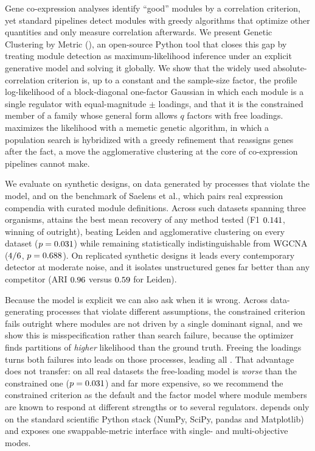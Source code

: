 Gene co-expression analyses identify ``good'' modules by a correlation criterion,
yet standard pipelines detect modules with greedy algorithms that optimize other
quantities and only measure correlation afterwards. We present Genetic Clustering
by Metric (\tool{}), an open-source Python tool that closes this gap by treating
module detection as maximum-likelihood inference under an explicit generative
model and solving it globally. We show that the widely used absolute-correlation
criterion is, up to a constant and the sample-size factor, the profile
log-likelihood of a block-diagonal one-factor Gaussian in which each module is a
single regulator with equal-magnitude $\pm$ loadings, and that it is the
constrained member of a family whose general form allows $q$ factors with free
loadings. \tool{} maximizes the likelihood with a memetic genetic
algorithm, in which a population search is hybridized with a greedy refinement that
reassigns genes after the fact, a move the agglomerative clustering at the core
of co-expression pipelines cannot make.

We evaluate on synthetic designs, on data generated by processes that violate the
model, and on the benchmark of Saelens et al., which pairs
real expression compendia with curated module definitions. Across
\SaelensNDatasets{} such datasets spanning three organisms, \tool{} attains the
best mean recovery of any method tested (F1 $0.141{}$, winning
\SaelensLoglikWins{} of \SaelensNDatasets{} outright), beating
Leiden and agglomerative clustering on every dataset ($p=0.031{}$) while
remaining statistically indistinguishable from WGCNA ($4/6{}$,
$p=0.688{}$). On replicated synthetic designs it leads every contemporary
detector at moderate noise, and it isolates unstructured genes far better than any
competitor (ARI $0.96{}$ versus $0.59{}$ for
Leiden).

Because the model is explicit we can also ask when it is wrong. Across
\MisspecTotal{} data-generating processes that violate different assumptions, the
constrained criterion fails outright where modules are not driven by a single
dominant signal, and we show this is misspecification rather than search failure,
because the optimizer finds partitions of \emph{higher} likelihood than the ground
truth. Freeing the loadings turns both failures into leads on those processes, leading all
\MisspecTotal{}. That advantage does not transfer: on all \SaelensNDatasets{} real
datasets the free-loading model is \emph{worse} than the constrained one
($p=0.031{}$) and far more expensive, so we recommend the constrained
criterion as the default and the factor model where module members are known to
respond at different strengths or to several regulators. \tool{} depends only on the standard scientific Python stack (NumPy, SciPy, pandas and Matplotlib) and exposes one swappable-metric interface with single- and
multi-objective modes.
